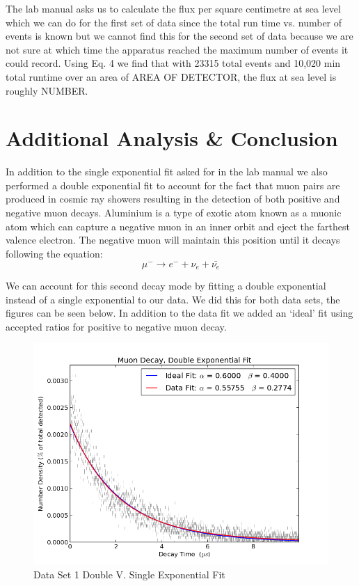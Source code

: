 \indent \indent The lab manual asks us to calculate the flux per square centimetre  at sea level which we can do for the first set of data since the total run time vs. number of events is known but we cannot find this for the second set of data because we are not sure at which time the apparatus reached the maximum number of events it could record.  Using Eq. 4 we find that with 23315 total events and 10,020 min total runtime over an area of AREA OF DETECTOR, the flux at sea level is roughly NUMBER.  


\section{Additional Analysis \& Conclusion}
\indent \indent In addition to the single exponential fit asked for in the lab manual we also performed a double exponential fit to account for the fact that muon pairs are produced in cosmic ray showers resulting in the detection of both positive and negative muon decays. Aluminium is a type of exotic atom known as a muonic atom which can capture a negative muon in an inner orbit and eject the farthest valence electron.  The negative muon will maintain this position until it decays following the equation:
\begin{equation}
	\mu^- \rightarrow e^- + \nu_e + \bar{\nu_e}
\end{equation}

\indent \indent We can account for this second decay mode by fitting a double exponential instead of a single exponential to our data.  We did this for both data sets, the figures can be seen below.  In addition to the data fit we added an `ideal' fit using accepted ratios for positive to negative muon decay.  

\begin{figure}[H]
\begin{center}
\includegraphics[width=4 in]{graph_EPBB1_DbleExp.png}
\caption{Data Set 1 Double V. Single Exponential Fit}
\end{center}
\end{figure}

